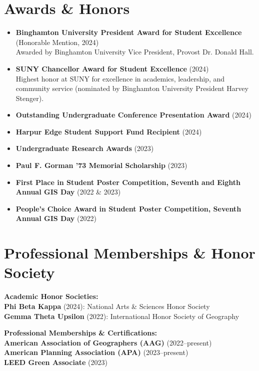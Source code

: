 \documentclass[11pt]{article}
\begin{document}
\section*{Awards \& Honors}
\begin{itemize}[leftmargin=*]
    \item \textbf{Binghamton University President Award for Student Excellence} (Honorable Mention, 2024) \\Awarded by Binghamton University Vice President, Provost Dr. Donald Hall.
    \item \textbf{SUNY Chancellor Award for Student Excellence} (2024) \\Highest honor at SUNY for excellence in academics, leadership, and community service (nominated by Binghamton University President Harvey Stenger).
    \item \textbf{Outstanding Undergraduate Conference Presentation Award} (2024)
    \item \textbf{Harpur Edge Student Support Fund Recipient} (2024)
    \item \textbf{Undergraduate Research Awards} (2023)
    \item \textbf{Paul F. Gorman '73 Memorial Scholarship} (2023)
    \item \textbf{First Place in Student Poster Competition, Seventh and Eighth Annual GIS Day} (2022 \& 2023)
    \item \textbf{People's Choice Award in Student Poster Competition, Seventh Annual GIS Day} (2022)
\end{itemize}

\section*{Professional Memberships \& Honor Society}
\noindent
\textbf{Academic Honor Societies:} \\
\textbf{Phi Beta Kappa} (2024): National Arts \& Sciences Honor Society \\
\textbf{Gemma Theta Upsilon} (2022): International Honor Society of Geography

\vspace{2mm}
\noindent
\textbf{Professional Memberships \& Certifications:} \\
\textbf{American Association of Geographers (AAG) }(2022--present) \\
\textbf{American Planning Association (APA)} (2023--present) \\
\textbf{LEED Green Associate} (2023)
\end{document}
